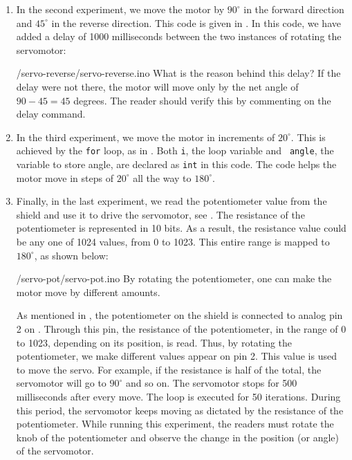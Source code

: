 \begin{enumerate}
  \item In the second experiment, we move the motor by $90^\circ$ in the
        forward direction and $45^\circ$ in the reverse direction.  This
        code is given in .  In this code, 
        we have added a delay of 1000 milliseconds between the two instances of 
        rotating the servomotor: 
        
        {\LocSERardcode/servo-reverse/servo-reverse.ino}
        What is the reason behind this delay?  If the delay were not
        there, the motor will move only by the net angle of $90-45 = 45$
        degrees.  The reader should verify this by commenting on the delay
        command.
        
  \item In the third experiment, we move the motor in increments of
        $20^\circ$.  This is achieved by the {\tt for} loop, as in
        .  Both {\tt i}, the loop variable and {\tt
            angle}, the variable to store angle, are declared as {\tt int} in
        this code.  The code helps the motor move in steps of $20^\circ$ all
        the way to $180^\circ$.  
        
  \item Finally, in the last experiment, we read the potentiometer value
        from the shield and use it to drive the servomotor, see
        .  The resistance of the potentiometer is
        represented in 10 bits.  As a result, the resistance value could be
        any one of 1024 values, from 0 to 1023.  This entire range is
        mapped to $180^\circ$, as shown below:
        
        {\LocSERardcode/servo-pot/servo-pot.ino}
        By rotating the potentiometer, one can make
        the motor move by different amounts.
        
        As mentioned in , the potentiometer on the shield is connected 
        to analog pin 2 on \arduino. Through this pin, the resistance of the potentiometer, in the range of 0 to 1023,
        depending on its position, is read.  Thus, by rotating the
        potentiometer, we make different values appear on pin 2.  This value
        is used to move the servo.  For example, if the resistance is half
        of the total, the servomotor will go to $90^\circ$ and so on.  The
        servomotor stops for 500 milliseconds after every move.  The loop is
        executed for 50 iterations. During this period, the servomotor keeps moving as dictated by the
        resistance of the potentiometer. While running this experiment, the readers 
        must rotate the knob of the potentiometer and observe 
        the change in the position (or angle) of the servomotor.   
        
\end{enumerate}

